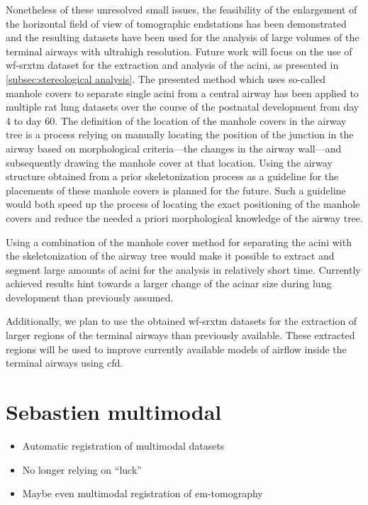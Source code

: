 Nonetheless of these unresolved small issues, the feasibility of the enlargement of the horizontal field of view of tomographic endstations has been demonstrated and the resulting datasets have been used for the analysis of large volumes of the terminal airways with ultrahigh resolution. Future work will focus on the use of \ac{wf-srxtm} dataset for the extraction and analysis of the acini, as presented in \autoref{subsec:stereological analysis}. The presented method which uses so-called manhole covers to separate single acini from a central airway has been applied to multiple rat lung datasets over the course of the postnatal development from day 4 to day 60. The definition of the location of the manhole covers in the airway tree is a process relying on manually locating the position of the junction in the airway based on morphological criteria---the changes in the airway wall---and subsequently drawing the manhole cover at that location. Using the airway structure obtained from a prior skeletonization process as a guideline for the placements of these manhole covers is planned for the future. Such a guideline would both speed up the process of locating the exact positioning of the manhole covers and reduce the needed a priori morphological knowledge of the airway tree.

Using a combination of the manhole cover method for separating the acini with the skeletonization of the airway tree would make it possible to extract and segment large amounts of acini for the analysis in relatively short time. Currently achieved results hint towards a larger change of the acinar size during lung development than previously assumed.

Additionally, we plan to use the obtained \ac{wf-srxtm} datasets for the extraction of larger regions of the terminal airways than previously available. These extracted regions will be used to improve currently available models of airflow inside the terminal airways \cite{Sznitman2007,Sznitman2009}  using \ac{cfd}.
 




\section{Sebastien multimodal}
\begin{itemize}
	\item Automatic registration of multimodal datasets
	\item No longer relying on ``luck''
	\item Maybe even multimodal registration of \ac{em}-tomography
\end{itemize}

